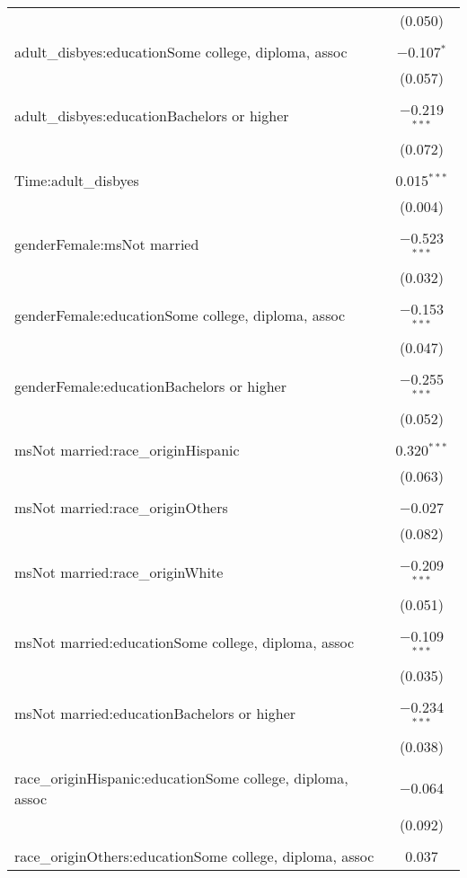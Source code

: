\begin{table}[!htbp]
\begin{tabular}{@{\extracolsep{5pt}}lc}
  & (0.050) \\ 
  & \\ 
 adult\_disbyes:educationSome college, diploma, assoc & $-$0.107$^{*}$ \\ 
  & (0.057) \\ 
  & \\ 
 adult\_disbyes:educationBachelors or higher & $-$0.219$^{***}$ \\ 
  & (0.072) \\ 
  & \\ 
 Time:adult\_disbyes & 0.015$^{***}$ \\ 
  & (0.004) \\ 
  & \\ 
 genderFemale:msNot married & $-$0.523$^{***}$ \\ 
  & (0.032) \\ 
  & \\ 
 genderFemale:educationSome college, diploma, assoc & $-$0.153$^{***}$ \\ 
  & (0.047) \\ 
  & \\ 
 genderFemale:educationBachelors or higher & $-$0.255$^{***}$ \\ 
  & (0.052) \\ 
  & \\ 
 msNot married:race\_originHispanic & 0.320$^{***}$ \\ 
  & (0.063) \\ 
  & \\ 
 msNot married:race\_originOthers & $-$0.027 \\ 
  & (0.082) \\ 
  & \\ 
 msNot married:race\_originWhite & $-$0.209$^{***}$ \\ 
  & (0.051) \\ 
  & \\ 
 msNot married:educationSome college, diploma, assoc & $-$0.109$^{***}$ \\ 
  & (0.035) \\ 
  & \\ 
 msNot married:educationBachelors or higher & $-$0.234$^{***}$ \\ 
  & (0.038) \\ 
  & \\ 
 race\_originHispanic:educationSome college, diploma, assoc & $-$0.064 \\ 
  & (0.092) \\ 
  & \\ 
 race\_originOthers:educationSome college, diploma, assoc & 0.037 \\ 

\end{tabular}
\end{table}
